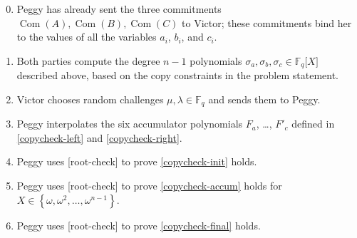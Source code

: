 \begin{enumerate}
\setcounter{enumi}{-1}
\item
  Peggy has already sent the three commitments
  \(\operatorname{Com}(A),\operatorname{Com}(B),\operatorname{Com}(C)\)
  to Victor; these commitments bind her to the values of all the
  variables \(a_{i}\), \(b_{i}\), and \(c_{i}\).
\item
  Both parties compute the degree \(n - 1\) polynomials
  \(\sigma_{a},\sigma_{b},\sigma_{c} \in {\mathbb{F}}_{q}\lbrack X\rbrack\)
  described above, based on the copy constraints in the problem
  statement.
\item
  Victor chooses random challenges \(\mu,\lambda \in {\mathbb{F}}_{q}\)
  and sends them to Peggy.
\item
  Peggy interpolates the six accumulator polynomials \(F_{a}\), \ldots,
  \(F'_{c}\) defined in \hyperref[copycheck-left]{{[}copycheck-left{]}}
  and \hyperref[copycheck-right]{{[}copycheck-right{]}}.
\item
  Peggy uses {[}root-check{]} to prove
  \hyperref[copycheck-init]{{[}copycheck-init{]}} holds.
\item
  Peggy uses {[}root-check{]} to prove
  \hyperref[copycheck-accum]{{[}copycheck-accum{]}} holds for
  \(X \in \left\{ \omega,\omega^{2},\ldots,\omega^{n - 1} \right\}\).
\item
  Peggy uses {[}root-check{]} to prove
  \hyperref[copycheck-final]{{[}copycheck-final{]}} holds.
\end{enumerate}
